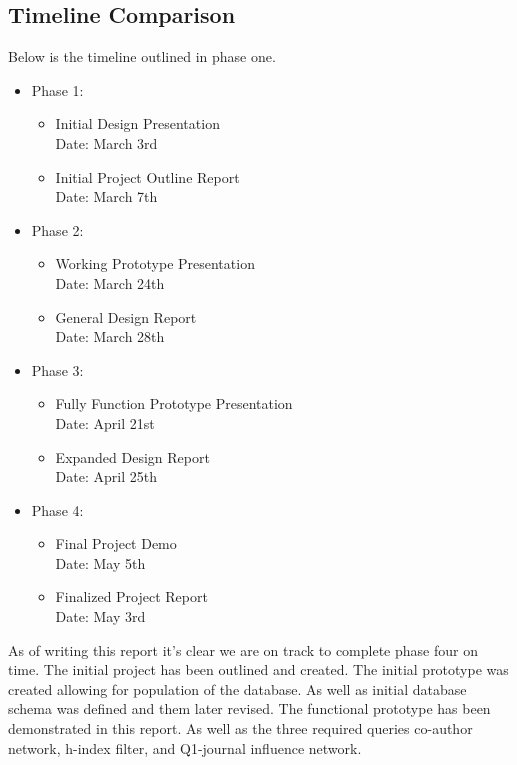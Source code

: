 \documentclass[sigconf]{acmart}
\begin{document}
\subsection{Timeline Comparison}
Below is the timeline outlined in phase one.
\begin{itemize}
    \item Phase 1: 
    \begin{itemize}
        \item Initial Design Presentation\\Date: March 3rd
        \item Initial Project Outline Report\\Date: March 7th
    \end{itemize}
    \item Phase 2: 
    \begin{itemize}
        \item Working Prototype Presentation\\Date: March 24th
        \item General Design Report\\Date: March 28th
    \end{itemize}
    \item Phase 3:
    \begin{itemize}
        \item Fully Function Prototype Presentation\\Date: April 21st
        \item Expanded Design Report\\Date: April 25th
    \end{itemize}
    \item Phase 4:
    \begin{itemize}
        \item Final Project Demo\\Date: May 5th
        \item Finalized Project Report\\Date: May 3rd
    \end{itemize}
\end{itemize}
As of writing this report it's clear we are on track to complete phase four on time. The initial project has been outlined and created. The initial prototype was created allowing for population of the database. As well as initial database schema was defined and them later revised. The functional prototype has been demonstrated in this report. As well as the three required queries co-author network, h-index filter, and Q1-journal influence network.
\end{document}
